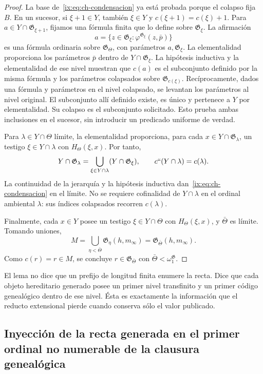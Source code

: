 \begin{proof}
La base de~\eqref{ix:eq:ch-condensacion} ya está probada porque el colapso fija \(B\). En un
sucesor, si \(\xi+1\in Y\), también \(\xi\in Y\) y
\(c(\xi+1)=c(\xi)+1\). Para
\(a\in Y\cap\mathfrak G_{\xi+1}\), fijamos una fórmula finita que lo
define sobre \(\mathfrak G_\xi\). La afirmación
\[
 a=\{z\in\mathfrak G_\xi:
                  \varphi^{\mathfrak G_\xi}(z,\bar p)\}
\]
es una fórmula ordinaria sobre \(\mathfrak G_\Theta\), con parámetros
\(a,\mathfrak G_\xi\). La elementalidad proporciona los parámetros
\(\bar p\) dentro de \(Y\cap\mathfrak G_\xi\). La hipótesis inductiva
y la elementalidad de ese nivel muestran que \(c(a)\) es el subconjunto
definido por la misma fórmula y los parámetros colapsados sobre
\(\mathfrak G_{c(\xi)}\). Recíprocamente, dados una fórmula y parámetros
en el nivel colapsado, se levantan los parámetros al nivel original.
El subconjunto allí definido existe, es único y pertenece a \(Y\) por
elementalidad. Su colapso es el subconjunto solicitado. Esto prueba ambas
inclusiones en el sucesor, sin introducir un predicado uniforme de verdad.

Para \(\lambda\in Y\cap\Theta\) límite, la elementalidad proporciona,
para cada \(x\in Y\cap\mathfrak G_\lambda\), un testigo
\(\xi\in Y\cap\lambda\) con \(H_\Theta(\xi,x)\). Por tanto,
\[
 Y\cap\mathfrak G_\lambda
 =\bigcup_{\xi\in Y\cap\lambda}(Y\cap\mathfrak G_\xi),
 \qquad c``(Y\cap\lambda)=c(\lambda).
\]
La continuidad de la jerarquía y la hipótesis inductiva dan~\eqref{ix:eq:ch-condensacion} en el
límite. No se requiere cofinalidad de \(Y\cap\lambda\) en el ordinal
ambiental \(\lambda\): sus índices colapsados recorren \(c(\lambda)\).

Finalmente, cada \(x\in Y\) posee un testigo \(\xi\in Y\cap\Theta\)
con \(H_\Theta(\xi,x)\), y \(\bar\Theta\) es límite. Tomando uniones,
\[
 M=\bigcup_{\eta<\bar\Theta}\mathfrak G_\eta(h,m_\infty)
  =\mathfrak G_{\bar\Theta}(h,m_\infty).
\]
Como \(c(r)=r\in M\), se concluye
\(r\in\mathfrak G_{\bar\Theta}\) con
\(\bar\Theta<\omega_1^{\mathfrak G}\).
\end{proof}

El lema no dice que un prefijo de longitud finita enumere la recta. Dice que
cada objeto hereditario generado posee un primer nivel transfinito y un primer
código genealógico dentro de ese nivel. Ésta es exactamente la información que
el reducto extensional pierde cuando conserva sólo el valor publicado.

\subsection{Inyección de la recta generada en el primer ordinal no numerable de la clausura genealógica}

